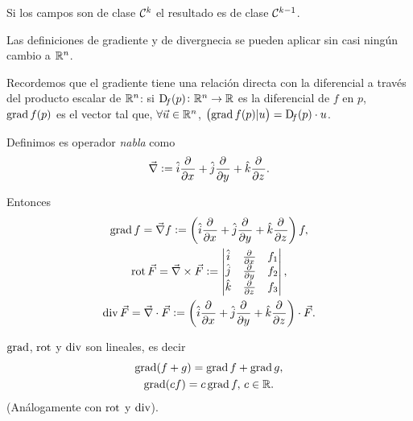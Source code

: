 \begin{obs*}
    Si los campos son de clase $\mathcal{C}^k$ el resultado es de clase $\mathcal{C}^{k-1}$.
\end{obs*}

\begin{obs*}
    Las definiciones de gradiente y de divergnecia se pueden aplicar sin casi ningún cambio a $\mathbb{R}^n$.
\end{obs*}

\begin{obs}
    Recordemos que el gradiente tiene una relación directa con la diferencial a trav\'es del producto escalar
    de $\mathbb{R}^n$: si $\Dif_f(p) \colon \real^n \to \real$ es la diferencial de $f$ en $p$, $\operatorname{grad} f(p)$ es el
    vector tal que, $\forall \vec{u} \in \mathbb{R}^n$, $\left( \grad f(p) \vert u \right) = \Dif_f(p) \cdot u$.
\end{obs}

\begin{defi}
    Definimos es operador \emph{nabla} como
    \[
        \vec{\nabla} := \hat{i} \frac{\partial^{} }{\partial x^{}} + \hat{j} \frac{\partial^{} }{\partial y^{}} + \hat{k} \frac{\partial^{} }{\partial z^{}}.
    \]

    Entonces
    \begin{gather*}
        \operatorname{grad} f = \vec{\nabla} f := \left( \hat{i} \frac{\partial^{} }{\partial x^{}} + \hat{j} \frac{\partial^{} }{\partial y^{}} + \hat{k} \frac{\partial^{} }{\partial z^{}} \right)f,
        \\
        \operatorname{rot} \vec{F} = \vec{\nabla} \times \vec{F} := \begin{vmatrix}
            \hat{i} & \frac{\partial^{} }{\partial x^{}} & f_1 \\
            \hat{j} & \frac{\partial^{} }{\partial y^{}} & f_2 \\
            \hat{k} & \frac{\partial^{} }{\partial z^{}} & f_3
        \end{vmatrix},
        \\
        \operatorname{div} \vec{F} = \vec{\nabla} \cdot \vec{F} := \left( \hat{i} \frac{\partial^{} }{\partial x^{}} + \hat{j} \frac{\partial^{} }{\partial y^{}} + \hat{k} \frac{\partial^{} }{\partial z^{}} \right) \cdot \vec{F}.
    \end{gather*}
\end{defi}

\begin{prop}
    $\operatorname{grad}$, $\operatorname{rot}$ y $\operatorname{div}$ son lineales, es decir
    \begin{gather*}
        \operatorname{grad}(f+g) = \operatorname{grad} f + \operatorname{grad} g, \\
        \operatorname{grad}(cf) = c\operatorname{grad} f, \, c \in \mathbb{R}.
    \end{gather*}
    (Análogamente con $\operatorname{rot}$ y $\operatorname{div}$).
\end{prop}

